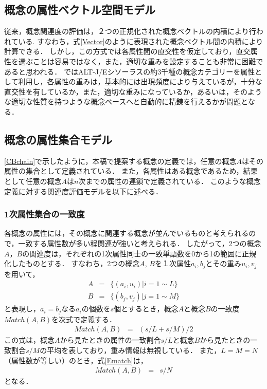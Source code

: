 \subsection{概念の属性ベクトル空間モデル}

従来，概念関連度の評価は，２つの正規化された概念ベクトルの内積により行われている\cite{matsuzawa,kasahara4,salton,ishikawa,hokari}.
すなわち，式\ref{Vector}のように表現された概念ベクトル間の内積により計算できる．
しかし，この方式では各属性間の直交性を仮定しており，直交属性を選ぶことは容易ではなく\cite{takama}，また，適切な重みを設定することも非常に困難であると思われる．
\cite{kasahara4,ishikawa,hokari}ではALT-J/Eシソーラス\cite{ikehara}の約3千種の概念カテゴリーを属性として利用し，各属性の重みは，基本的には出現頻度により与えているが，十分な直交性を有しているか，また，適切な重みになっているか，あるいは，そのような適切な性質を持つような概念ベースへと自動的に精錬を行えるかが問題となる．

\subsection{概念の属性集合モデル}

\ref{CBchain}で示したように，本稿で提案する概念の定義では，任意の概念$A$はその属性の集合として定義されている．
また，各属性はある概念であるため，結果として任意の概念$A$は$n$次までの属性の連鎖で定義されている．
このような概念定義に対する関連度評価モデルを以下に述べる．

\subsubsection{1次属性集合の一致度}

各概念の属性には，その概念に関連する概念が並んでいるものと考えられるので，一致する属性数が多い程関連が強いと考えられる．
したがって，2つの概念$A$，$B$の関連度は，それぞれの1次属性同士の一致単語数を0から1の範囲に正規化したものとする．
すなわち，2つの概念$A$, $B$を１次属性$a_i, b_j$とその重み$u_i, v_j$を用いて，
\begin{eqnarray}
A &=& \{ (a_i, u_i) | i=1\sim L \} 	\label{ConA} \\
B &=& \{ (b_j, v_j) | j=1\sim M \}	\label{ConB}
\end{eqnarray}
と表現し，$a_i = b_j$なる$a_i$の個数を$s$個とするとき，概念$A$と概念$B$の一致度$Match(A,B)$を次式で定義する．
\begin{eqnarray}
Match(A,B) &=& (s/L + s/M)/2	\label{Ematch}
\end{eqnarray}
この式は，概念$A$から見たときの属性の一致割合$s/L$と概念$B$から見たときの一致割合$s/M$の平均を表しており，重み情報は無視している．
また，$L = M = N$（属性数が等しい）のとき，式\ref{Ematch}は，
\begin{eqnarray}
Match(A,B) &=& s/N	\label{EmatchN}
\end{eqnarray}
となる．

